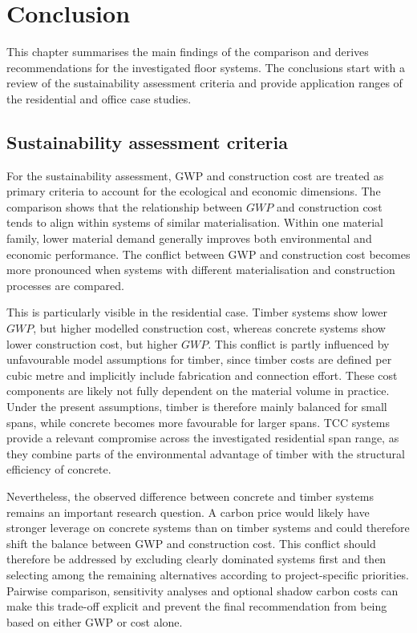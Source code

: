 \chapter{Conclusion}\label{chap:Conclusion} 

This chapter summarises the main findings of the comparison and derives recommendations for the investigated floor systems. The conclusions start with a review of the sustainability assessment criteria and provide application ranges of the residential and office case studies.

\section{Sustainability assessment criteria}
For the sustainability assessment, GWP and construction cost are treated as primary criteria to account for the ecological and economic dimensions. The comparison shows that the relationship between \(GWP\) and construction cost tends to align within systems of similar materialisation. Within one material family, lower material demand generally improves both environmental and economic performance. The conflict between GWP and construction cost becomes more pronounced when systems with different materialisation and construction processes are compared.

This is particularly visible in the residential case. Timber systems show lower \(GWP\), but higher modelled construction cost, whereas concrete systems show lower construction cost, but higher \(GWP\). This conflict is partly influenced by unfavourable model assumptions for timber, since timber costs are defined per cubic metre and implicitly include fabrication and connection effort. These cost components are likely not fully dependent on the material volume in practice. Under the present assumptions, timber is therefore mainly balanced for small spans, while concrete becomes more favourable for larger spans. TCC systems provide a relevant compromise across the investigated residential span range, as they combine parts of the environmental advantage of timber with the structural efficiency of concrete.

Nevertheless, the observed difference between concrete and timber systems remains an important research question. A carbon price would likely have stronger leverage on concrete systems than on timber systems and could therefore shift the balance between GWP and construction cost. This conflict should therefore be addressed by excluding clearly dominated systems first and then selecting among the remaining alternatives according to project-specific priorities. Pairwise comparison, sensitivity analyses and optional shadow carbon costs can make this trade-off explicit and prevent the final recommendation from being based on either GWP or cost alone.

